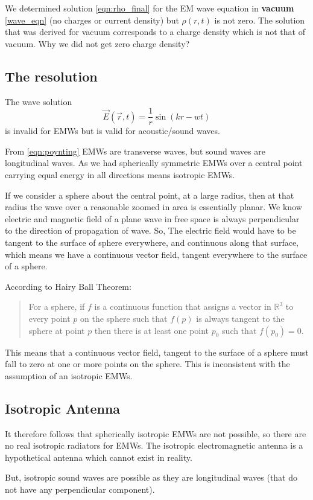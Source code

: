 We determined solution \eqref{eqn:rho_final} for the EM wave equation in \textbf{vacuum} \eqref{wave_eqn} (no charges or current density) but $\rho(r,t)$ is not zero. The solution that was derived for vacuum corresponds to a charge density which is not that of vacuum. Why we did not get zero charge density?

\subsection{The resolution}

The wave solution
%
   \begin{equation}
      \vec{E}(\vec{r},t) = \frac{1}{r}\sin(kr-wt)
   \end{equation}
%
is invalid for EMWs but is valid for acoustic/sound waves.

From \eqref{eqn:poynting} EMWs are transverse waves, but sound waves are longitudinal waves. As we had spherically symmetric EMWs over a central point carrying equal energy in all directions means isotropic EMWs.

If we consider a sphere about the central point, at a large radius, then at that radius the wave over a reasonable zoomed in area is essentially planar. We know electric and magnetic field of a plane wave in free space is always perpendicular to the direction of propagation of wave. So, The electric field would have to be tangent to the surface of sphere everywhere, and continuous along that surface, which means we have a continuous vector field, tangent everywhere to the surface of a sphere.

According to Hairy Ball Theorem:
%
\begin{quote}
   For a sphere, if $f$ is a continuous function that assigns a vector in $\mathbb{R}^3$ to every point $p$ on the sphere such that $f(p)$ is always tangent to the sphere at point $p$ then there is at least one point $p_0$ such that $f(p_0) = 0$.
\end{quote}

This means that a continuous vector field, tangent to the surface of a sphere must fall to zero at one or more points on the sphere. This is inconsistent with the assumption of an isotropic EMWs.

\subsection{Isotropic Antenna}

It therefore follows that spherically isotropic EMWs are not possible, so there are no real isotropic radiators for EMWs. The isotropic electromagnetic antenna is a hypothetical antenna which cannot exist in reality.

But, isotropic sound waves are possible as they are longitudinal waves (that do not have any perpendicular component).
